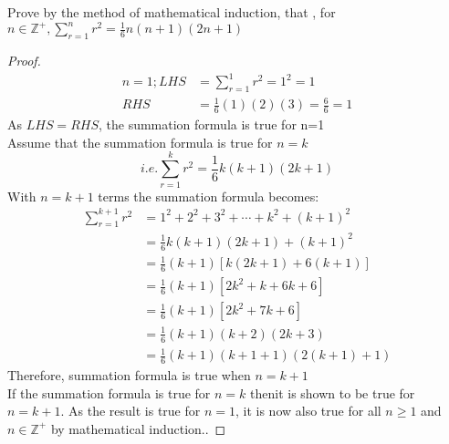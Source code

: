 \documentclass[a4paper]{article}
\begin{document}
\begin{eg}
	Prove by the method of mathematical induction, that , for $n\in\mathbb{Z}^+ , \sum_{r=1}^nr^2=\frac{1}{6}n(n+1)(2n+1)$
	\begin{proof}
		\begin{align*}
			n=1; LHS & =\sum_{r=1}^1r^2=1^2=1              \\
			RHS      & =\frac{1}{6}(1)(2)(3)=\frac{6}{6}=1
		\end{align*}
		As $LHS=RHS$, the summation formula is true for n=1\\

		Assume that the summation formula is true for $n=k$
		\begin{equation*}
			i.e.\sum_{r=1}^kr^2=\frac{1}{6}k(k+1)(2k+1)
		\end{equation*}
		With $n=k+1$ terms the summation formula becomes:
		\begin{align*}
			\sum_{r=1}^{k+1}r^2 & =1^2+2^2+3^2+\cdots+k^2+(k+1)^2    \\
			                    & =\frac{1}{6}k(k+1)(2k+1)+(k+1)^2   \\
			                    & =\frac{1}{6}(k+1)[k(2k+1)+6(k+1)]  \\
			                    & =\frac{1}{6}(k+1)[2k^2+k+6k+6]     \\
			                    & =\frac{1}{6}(k+1)[2k^2+7k+6]       \\
			                    & =\frac{1}{6}(k+1)(k+2)(2k+3)       \\
			                    & =\frac{1}{6}(k+1)(k+1+1)(2(k+1)+1)
		\end{align*}
		Therefore, summation formula is true when $n=k+1$\\
		If the summation formula is true for $n=k$ thenit is shown to be true for $n=k+1$. As the result is true for $n=1$, it is now also true for all $n\geq1$ and $n\in\mathbb{Z}^+$ by mathematical induction..
	\end{proof}
\end{eg}
\end{document}
